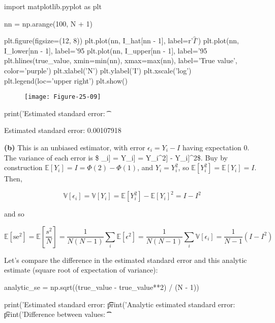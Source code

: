 \begin{python}
import matplotlib.pyplot as plt

nn = np.arange(100, N + 1)

plt.figure(figsize=(12, 8))
plt.plot(nn, I_hat[nn - 1], label=r'$\hat{I}$')
plt.plot(nn, I_lower[nn - 1], label='95%
plt.plot(nn, I_upper[nn - 1], label='95%
plt.hlines(true_value, xmin=min(nn), xmax=max(nn), label='True value', color='purple')
plt.xlabel('N')
plt.ylabel('I')
plt.xscale('log')
plt.legend(loc='upper right')
plt.show()
\end{python}

\begin{figure}[H]
\texttt{[image: Figure-25-09]}
\end{figure}

\begin{python}
print('Estimated standard error: \t %
\end{python}

\begin{console}
Estimated standard error:        0.00107918
\end{console}

\textbf{(b)} This is an unbiased estimator, with error
\(\epsilon_i = Y_i - I\) having expectation 0. The variance of each
error is \$ \mathbb{V}{[}\epsilon\_i{]} = \mathbb{V}{[}Y\_i{]} =
\mathbb{E}{[}Y\_i\^{}2{]} - \mathbb{E}{[}Y\_i{]}\^{}2\$. Buy by
construction \(\mathbb{E}[Y_i] = I = \Phi(2) - \Phi(1)\), and
\(Y_i = Y_i^2\), so \(\mathbb{E}[Y_i^2] = \mathbb{E}[Y_i] = I\). Then,

\[ \mathbb{V}[\epsilon_i] = \mathbb{V}[Y_i] = \mathbb{E}[Y_i^2] - \mathbb{E}[Y_i]^2 = I - I^2 \]

and so

\[ \mathbb{E}[\text{se}^2] = \mathbb{E}\left[\frac{s^2}{N}\right] = \frac{1}{N(N - 1)} \sum_i \mathbb{E}[\epsilon^2] = \frac{1}{N(N - 1)} \sum_i \mathbb{V}[\epsilon_i] = \frac{1}{N - 1} (I - I^2) \]

Let's compare the difference in the estimated standard error and this
analytic estimate (square root of expectation of variance):

\begin{python}
analytic_se = np.sqrt((true_value - true_value**2) / (N - 1))

print('Estimated standard error: \t\t %
print('Analytic estimated standard error: \t %
print('Difference between values: \t\t %
\end{python}

